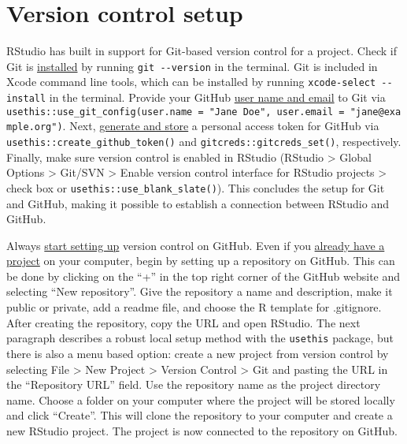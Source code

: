 \documentclass[
  letterpaper,
  DIV=11,
  numbers=noendperiod]{scrreport}
\begin{document}
\section{Version control setup}\label{version-control-setup}

RStudio has built in support for Git-based version control for a
project. Check if Git is
\href{https://happygitwithr.com/install-git}{installed} by running
\texttt{git\ -\/-version} in the terminal. Git is included in Xcode
command line tools, which can be installed by running
\texttt{xcode-select\ -\/-install} in the terminal. Provide your GitHub
\href{https://happygitwithr.com/hello-git}{user name and email} to Git
via
\texttt{usethis::use\_git\_config(user.name\ =\ "Jane\ Doe",\ user.email\ =\ "jane@example.org")}.
Next, \href{https://happygitwithr.com/https-pat\#tldr}{generate and
store} a personal access token for GitHub via
\texttt{usethis::create\_github\_token()} and
\texttt{gitcreds::gitcreds\_set()}, respectively. Finally, make sure
version control is enabled in RStudio (RStudio \textgreater{} Global
Options \textgreater{} Git/SVN \textgreater{} Enable version control
interface for RStudio projects \textgreater{} check box or
\texttt{usethis::use\_blank\_slate()}). This concludes the setup for Git
and GitHub, making it possible to establish a connection between RStudio
and GitHub.

Always \href{https://happygitwithr.com/new-github-first}{start setting
up} version control on GitHub. Even if you
\href{https://happygitwithr.com/existing-github-first}{already have a
project} on your computer, begin by setting up a repository on GitHub.
This can be done by clicking on the ``+'' in the top right corner of the
GitHub website and selecting ``New repository''. Give the repository a
name and description, make it public or private, add a readme file, and
choose the R template for .gitignore. After creating the repository,
copy the URL and open RStudio. The next paragraph describes a robust
local setup method with the \texttt{usethis} package, but there is also
a menu based option: create a new project from version control by
selecting File \textgreater{} New Project \textgreater{} Version Control
\textgreater{} Git and pasting the URL in the ``Repository URL'' field.
Use the repository name as the project directory name. Choose a folder
on your computer where the project will be stored locally and click
``Create''. This will clone the repository to your computer and create a
new RStudio project. The project is now connected to the repository on
GitHub.
\end{document}
